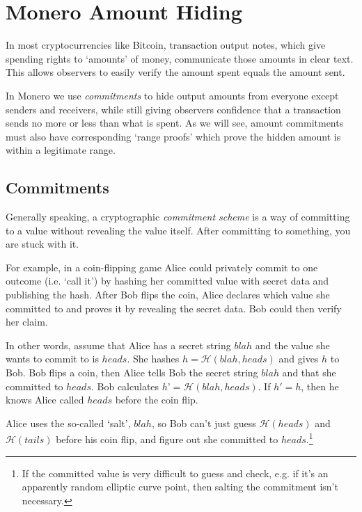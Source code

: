 \chapter{Monero Amount Hiding}
\label{chapter:pedersen-commitments}

In most cryptocurrencies like Bitcoin, transaction output notes, which give spending rights to `amounts' of money, communicate those amounts in clear text. This allows observers to easily verify the amount spent equals the amount sent.

In Monero we use {\em commitments} to hide output amounts from everyone except senders and receivers, while still giving observers confidence that a transaction sends no more or less than what is spent. As we will see, amount commitments must also have corresponding `range proofs' which prove the hidden amount is within a legitimate range.



\section{Commitments}
\label{sec:commitments}

Generally speaking, a cryptographic {\em commitment scheme} is a way of committing to a value without revealing the value itself. After committing to something, you are stuck with it.

For example, in a coin-flipping game Alice could privately commit to one outcome (i.e. ‘call it’) by hashing her committed value with secret data and publishing the hash. After Bob flips the coin, Alice declares which value she committed to and proves it by revealing the secret data. Bob could then verify her claim.

In other words, assume that Alice has a secret string $blah$ and the value she wants to commit to is $heads$. She hashes $h = \mathcal{H}(blah, heads)$ and gives $h$ to Bob. Bob flips a coin, then Alice tells Bob the secret string $blah$ and that she committed to $heads$. Bob calculates $h’ = \mathcal{H}(blah, heads)$. If $h' = h$, then he knows Alice called $heads$ before the coin flip.

Alice uses the so-called `salt', $blah$, so Bob can't just guess $\mathcal{H}(heads)$ and $\mathcal{H}(tails)$ before his coin flip, and figure out she committed to $heads$.\footnote{If the committed value is very difficult to guess and check, e.g. if it's an apparently random elliptic curve point, then salting the commitment isn't necessary.}



